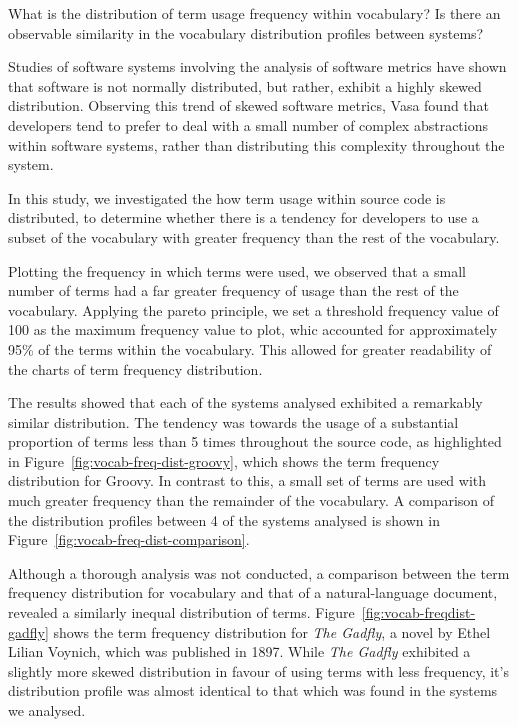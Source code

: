 What is the distribution of term usage frequency within vocabulary? Is there an observable similarity in the vocabulary distribution profiles between systems?

Studies of software systems involving the analysis of software metrics have shown that software is not normally distributed, but rather, exhibit a highly skewed distribution. Observing this trend of skewed software metrics, Vasa found that developers tend to prefer to deal with a small number of complex abstractions within software systems, rather than distributing this complexity throughout the system.

In this study, we investigated the how term usage within source code is distributed, to determine whether there is a tendency for developers to use a subset of the vocabulary with greater frequency than the rest of the vocabulary.

Plotting the frequency in which terms were used, we observed that a small number of terms had a far greater frequency of usage than the rest of the vocabulary. Applying the pareto principle, we set a threshold frequency value of 100 as the maximum frequency value to plot, whic accounted for approximately 95\% of the terms within the vocabulary. This allowed for greater readability of the charts of term frequency distribution.

The results showed that each of the systems analysed exhibited a remarkably similar distribution. The tendency was towards the usage of a substantial proportion of terms less than 5 times throughout the source code, as highlighted in Figure~\ref{fig:vocab-freq-dist-groovy}, which shows the term frequency distribution for Groovy. In contrast to this, a small set of terms are used with much greater frequency than the remainder of the vocabulary. A comparison of the distribution profiles between 4 of the systems analysed is shown in Figure~\ref{fig:vocab-freq-dist-comparison}.

Although a thorough analysis was not conducted, a comparison between the term frequency distribution for vocabulary and that of a natural-language document, revealed a similarly inequal distribution of terms. Figure~\ref{fig:vocab-freqdist-gadfly} shows the term frequency distribution for \emph{The Gadfly}, a novel by Ethel Lilian Voynich, which was published in 1897. While \emph{The Gadfly} exhibited a slightly more skewed distribution in favour of using terms with less frequency, it's distribution profile was almost identical to that which was found in the systems we analysed.

